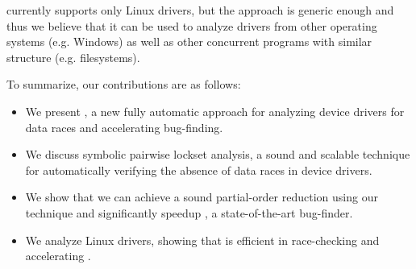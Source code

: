 \whoop currently supports only Linux drivers, but the approach is generic enough and thus we believe that it can be used to analyze drivers from other operating systems (e.g. Windows) as well as other concurrent programs with similar structure (e.g. filesystems).

To summarize, our contributions are as follows:
\begin{itemize}
\item We present \whoop, a new fully automatic approach for analyzing device drivers for data races and accelerating bug-finding.
\item We discuss symbolic pairwise lockset analysis,  a sound and scalable technique for automatically verifying the absence of data races in device drivers.
\item We show that we can achieve a sound partial-order reduction using our technique and significantly speedup \corral, a state-of-the-art bug-finder.
\item We analyze \sizeOfBenchmarks Linux drivers, showing that \whoop is efficient in race-checking and accelerating \corral.
\end{itemize}
